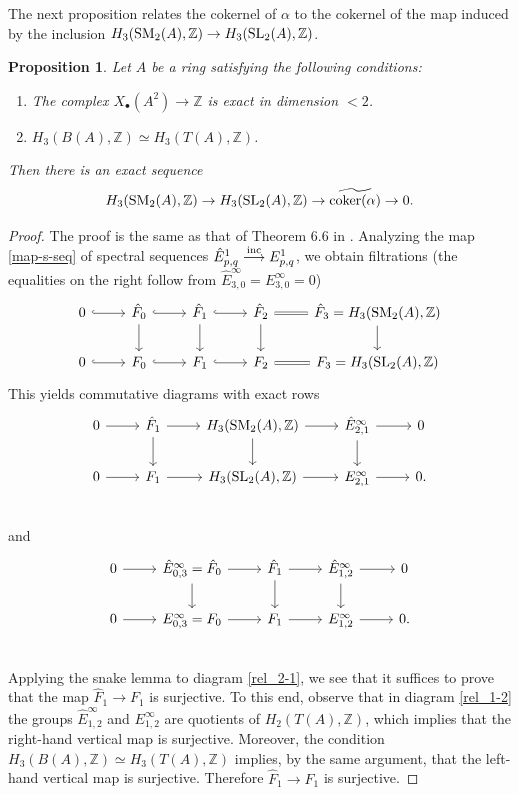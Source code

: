 \documentclass[11pt]{amsart}
\theoremstyle{definition}
\theoremstyle{plain}
\newtheorem{prp}[ntn]{Proposition}
\theoremstyle{definition}
\numberwithin{equation}{section}
\newcommand{\z}{\mathbb{Z}}
\newcommand{\SL}{\mathit{{\rm SL}}}
\newcommand{\SM}{\mathit{{\rm SM}}}
\newcommand{\inc}{{\rm inc}}
\newcommand{\coker}{{\rm coker}}
\begin{document}
	The next proposition relates the cokernel of $\alpha$ to the cokernel of the map induced by the inclusion $H_3(\SM_2(A),\z)\to H_3(\SL_2(A),\z)$. 
	\begin{prp}\label{prp-sm2-sl2}
		Let $A$ be a ring satisfying the following conditions:
		\begin{enumerate}
			\item The complex $X_{\bullet}(A^2)\to\z$ is exact in dimension $<2$.
			\item $H_3(B(A),\z)\simeq H_3(T(A),\z)$.
		\end{enumerate}
		Then there is an exact sequence
		\[
		H_3(\SM_2(A),\z)\to H_3(\SL_2(A),\z)\to \widetilde{\coker(\alpha)}\to 0.
		\]
	\end{prp}
	\begin{proof}
		The proof is the same as that of Theorem 6.6 in \cite{B-E--2023}. Analyzing the map \eqref{map-s-seq} of spectral sequences $\hat{E}^1_{p,q}\overset{\inc}{\longrightarrow} E^1_{p,q}$, we obtain filtrations (the equalities on the right follow from $\hat{E}^{\infty}_{3,0}=E^{\infty}_{3,0}=0$)
		\[
		\begin{tikzcd}
			0\ar[r,hook] & \hat{F}_0 \ar[r,hook]\ar[d] & \hat{F}_1 \ar[r,hook]\ar[d] & \hat{F}_2 \ar[r,equal]\ar[d] & \hat{F}_3 = H_3(\SM_2(A),\z)\ar[d]\\
			0\ar[r,hook] & F_0 \ar[r,hook] & F_1 \ar[r,hook] & F_2 \ar[r,equal] & F_3 = H_3(\SL_2(A),\z)
		\end{tikzcd}
		\]
		This yields commutative diagrams with exact rows
		\begin{equation}
			\label{rel_2-1}
			\begin{tikzcd}
				0 \ar[r] & \hat{F}_1 \ar[r]\ar[d] & H_3(\SM_2(A),\z)\ar[r]\ar[d] & \hat{E}^{\infty}_{2,1}\ar[r]\ar[d] & 0\\
				0 \ar[r] & F_1 \ar[r] & H_3(\SL_2(A),\z)\ar[r] & E^{\infty}_{2,1}\ar[r] & 0.\\
			\end{tikzcd}    
		\end{equation}
		and
		\begin{equation}
			\label{rel_1-2}
			\begin{tikzcd}
				0 \ar[r] & \hat{E}^{\infty}_{0,3}=\hat{F}_0 \ar[r]\ar[d] & \hat{F}_1 \ar[r]\ar[d] & \hat{E}^{\infty}_{1,2}\ar[r]\ar[d] & 0\\
				0 \ar[r] & E^{\infty}_{0,3}=F_0 \ar[r] & F_1 \ar[r] & E^{\infty}_{1,2}\ar[r] & 0.\\
			\end{tikzcd}    
		\end{equation}
		Applying the snake lemma to diagram \eqref{rel_2-1}, we see that it suffices to prove that the map $\hat{F}_1\to F_1$ is surjective. To this end, observe that in diagram \eqref{rel_1-2} the groups $\hat{E}^{\infty}_{1,2}$ and $E^{\infty}_{1,2}$ are quotients of $H_2(T(A),\z)$, which implies that the right-hand vertical map is surjective. Moreover, the condition $H_3(B(A),\z)\simeq H_3(T(A),\z)$ implies, by the same argument, that the left-hand vertical map is surjective. Therefore $\hat{F}_1\to F_1$ is surjective.
	\end{proof}
\end{document}

